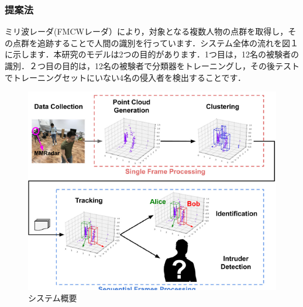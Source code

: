 \documentclass[dvipdfmx]{jsarticle}
\begin{document}
\subsubsection{提案法}
ミリ波レーダ(FMCWレーダ）により，対象となる複数人物の点群を取得し，その点群を追跡することで人間の識別を行っています．システム全体の流れを図１に示します．本研究のモデルは2つの目的があります．1つ目は，12名の被験者の識別．２つ目の目的は，12名の被験者で分類器をトレーニングし，その後テストでトレーニングセットにいない4名の侵入者を検出することです．

\begin{figure}[H]
    \begin{center}
    \includegraphics[width=0.7\linewidth]{./img/tuiseki_system.png}
    \end{center}
    \caption{システム概要}
    \end{figure}
\end{document}
